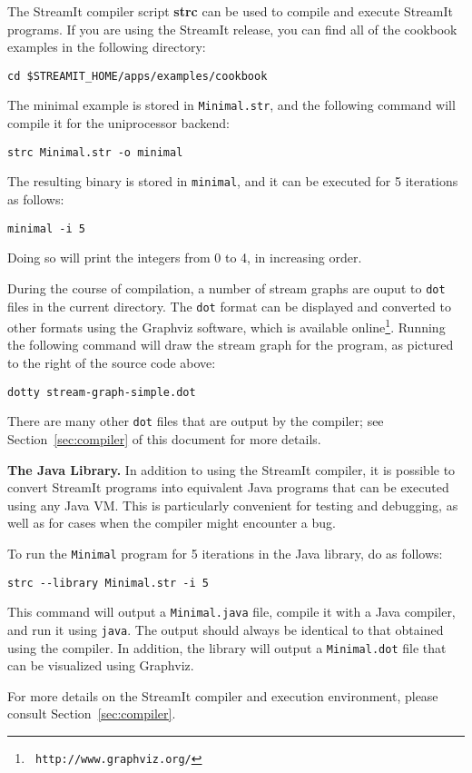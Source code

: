 The StreamIt compiler script {\bf strc} can be used to compile and
execute StreamIt programs.  If you are using the StreamIt release, you
can find all of the cookbook examples in the following directory:
\begin{verbatim}
cd $STREAMIT_HOME/apps/examples/cookbook
\end{verbatim}
The minimal example is stored in {\tt Minimal.str}, and the following
command will compile it for the uniprocessor backend:
\begin{verbatim}
strc Minimal.str -o minimal
\end{verbatim}
The resulting binary is stored in {\tt minimal}, and it can be
executed for 5 iterations as follows:
\begin{verbatim}
minimal -i 5
\end{verbatim}
Doing so will print the integers from 0 to 4, in increasing order.

During the course of compilation, a number of stream graphs are ouput
to {\tt dot} files in the current directory.  The {\tt dot} format can
be displayed and converted to other formats using the Graphviz
software, which is available online\footnote{\tt
http://www.graphviz.org/}.  Running the following command will draw
the stream graph for the program, as pictured to the right of the
source code above:
\begin{verbatim}
dotty stream-graph-simple.dot
\end{verbatim}
There are many other {\tt dot} files that are output by the compiler;
see Section~\ref{sec:compiler} of this document for more details.

{\bf The Java Library.}  In addition to using the StreamIt compiler,
it is possible to convert StreamIt programs into equivalent Java
programs that can be executed using any Java VM.  This is particularly
convenient for testing and debugging, as well as for cases when the
compiler might encounter a bug.

To run the {\tt Minimal} program for 5 iterations in the Java library,
do as follows:
\begin{verbatim}
strc --library Minimal.str -i 5
\end{verbatim}
This command will output a {\tt Minimal.java} file, compile it with a
Java compiler, and run it using {\tt java}.  The output should always
be identical to that obtained using the compiler.  In addition, the
library will output a {\tt Minimal.dot} file that can be visualized
using Graphviz.

For more details on the StreamIt compiler and execution environment,
please consult Section~\ref{sec:compiler}.
